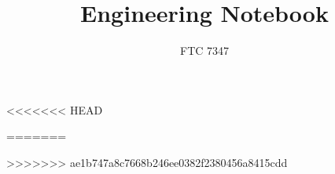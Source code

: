 \documentclass[a4paper,10pt]{article}
\title{Engineering Notebook}
\author{FTC 7347}
\begin{document}
\maketitle

























<<<<<<< HEAD





=======






%







%


>>>>>>> ae1b747a8c7668b246ee0382f2380456a8415cdd
\end{document}
